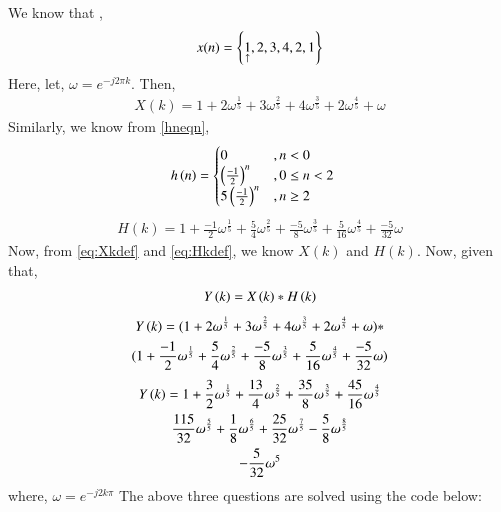 \documentclass[journal,12pt,twocolumn]{IEEEtran}
\theoremstyle{remark}
\renewcommand\thesection{\arabic{section}}
\numberwithin{equation}{subsection}
\begin{document}
\begin{enumerate}[label=\thesection.\arabic*]
We know that ,\\
\begin{equation}
	x(n) = \left\{\underset{\uparrow}{1},2,3,4,2,1\right\}
\end{equation}
Here, let, $\omega=e^{-j2\pi k}$. Then,
\begin{align}
	X(k)=1+2\omega^{\frac{1}{5}}+3\omega^{\frac{2}{5}}+4\omega^{\frac{3}{5}}+2\omega^{\frac{4}{5}}+\omega
	\label{eq:Xkdef}
\end{align}
Similarly, we know from \eqref{hneqn},
\begin{align}
	h\left(n\right) &= \begin{cases}
					 0 &, n < 0\\
					 \left(\frac{-1}{2}\right)^n &, 0\leq n<2\\
					 5\left(\frac{-1}{2}\right)^n &, n \geq 2
				  \end{cases}
\end{align}
\begin{align}
	H(k)=1+\frac{-1}{2}\omega^{\frac{1}{5}}+\frac{5}{4}\omega^{\frac{2}{5}}+\frac{-5}{8}\omega^{\frac{3}{5}}+\frac{5}{16}\omega^{\frac{4}{5}}+\frac{-5}{32}\omega
	\label{eq:Hkdef}
\end{align}
Now, from \eqref{eq:Xkdef} and \eqref{eq:Hkdef}, we know $X(k)$ and $H(k)$. Now, given that,
\begin{equation}
	\label{eq:fp}
	Y\left(k\right)=X\left(k\right)*H\left(k\right)
\end{equation}
\begin{multline}
	Y\left(k\right)= (1+2\omega^{\frac{1}{5}}+3\omega^{\frac{2}{5}}+4\omega^{\frac{3}{5}}+2\omega^{\frac{4}{5}}+\omega)* \\(1+\frac{-1}{2}\omega^{\frac{1}{5}}+\frac{5}{4}\omega^{\frac{2}{5}}+\frac{-5}{8}\omega^{\frac{3}{5}}+\frac{5}{16}\omega^{\frac{4}{5}}+\frac{-5}{32}\omega)
\end{multline}
\begin{multline}
	Y\left(k\right)= 1+\frac{3}{2}\omega^{\frac{1}{5}}+\frac{13}{4}\omega^{\frac{2}{5}}+\frac{35}{8}\omega^{\frac{3}{5}}+\frac{45}{16}\omega^{\frac{4}{5}}\\\frac{115}{32}\omega^{\frac{5}{5}}+\frac{1}{8}\omega^{\frac{6}{5}}+\frac{25}{32}\omega^{\frac{7}{5}}-\frac{5}{8}\omega^{\frac{8}{5}}\\-\frac{5}{32}\omega^{5} 
\end{multline}
where, $\omega=e^{-j2k\pi}$
The above three questions are solved using the code below:

\end{enumerate}
\end{document}
